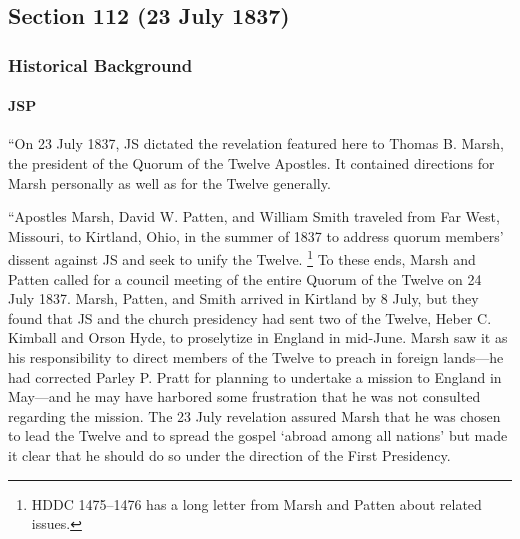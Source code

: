 \subsection{Section 112 (23 July 1837)}
	\label{DC112}
	
	\subsubsection{Historical Background}
		\label{DC112-HB}
		
		\paragraph{JSP}
		
			``On 23 July 1837, JS dictated the revelation featured here to Thomas B. Marsh, the president of the Quorum of the Twelve Apostles. It contained directions for Marsh personally as well as for the Twelve generally.

			``Apostles Marsh, David W. Patten, and William Smith traveled from Far West, Missouri, to Kirtland, Ohio, in the summer of 1837 to address quorum members' dissent against JS and seek to unify the Twelve.%
				\footnote{%
					HDDC 1475--1476 has a long letter from Marsh and Patten about related issues.
					} 
			To these ends, Marsh and Patten called for a council meeting of the entire Quorum of the Twelve on 24 July 1837. Marsh, Patten, and Smith arrived in Kirtland by 8 July, but they found that JS and the church presidency had sent two of the Twelve, Heber C. Kimball and Orson Hyde, to proselytize in England in mid-June. Marsh saw it as his responsibility to direct members of the Twelve to preach in foreign lands---he had corrected Parley P. Pratt for planning to undertake a mission to England in May---and he may have harbored some frustration that he was not consulted regarding the mission. The 23 July revelation assured Marsh that he was chosen to lead the Twelve and to spread the gospel `abroad among all nations' but made it clear that he should do so under the direction of the First Presidency.

